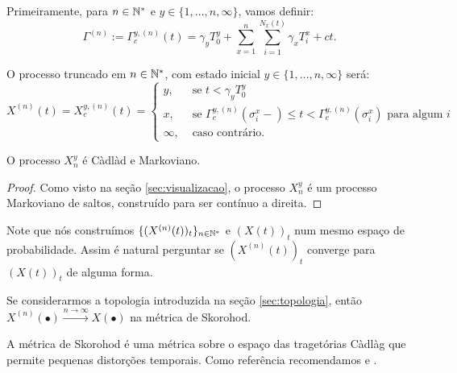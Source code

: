 Primeiramente, para $n \in {\mathbb{N^*}}$ e $y \in \{1, \ldots, n, \infty\}$,
vamos definir:
\begin{equation}
  \Gamma^{(n)} := \Gamma^{y,(n)}_c (t) = \gamma_y T_0^y
  + \sum_{x =1}^{n} \sum_{i = 1}^{N_x(t)}
  \gamma_x T_i^x
  + ct.
\end{equation}

O processo truncado em $n \in {\mathbb{N^*}}$, com estado inicial $y \in \{1,
\ldots, n, \infty\}$ será:
\begin{equation}
  X^{(n)}(t) = X^{y,(n)}_c(t) = \begin{cases}
    y, & \textrm{ se }  t < \gamma_y T_0^y\\
    x, & \textrm{ se } \Gamma^{y,(n)}_c(\sigma_i^x-) \leq t <
    \Gamma^{y,(n)}_c(\sigma^x_i)
    \textrm{ para algum } i \\
    \infty, & \textrm{ caso contrário.}
  \end{cases}
\end{equation}

\begin{proposicao}
  O processo $X_n^y$ é Càdlàd e Markoviano.
\end{proposicao}
\begin{proof}
  Como visto na seção \ref{sec:visualizacao}, o processo $X_n^y$ é um
  processo Markoviano de saltos, construído para ser contínuo a
  direita.
\end{proof}

Note que nós construímos $\{(X^{(n)}(t))_t\}_{n \in {\mathbb{N^*}}}$ e $(X(t))_t$
num mesmo espaço de probabilidade. Assim é natural perguntar se
$(X^{(n)}(t))_t$ converge para $(X(t))_t$ de alguma forma.

\begin{teorema}
  \label{teo:convergencia}
  Se considerarmos a topologia introduzida na seção
  \ref{sec:topologia}, então $X^{(n)} (\bullet) \xrightarrow{n \to
    \infty} X(\bullet)$ \qc na métrica de Skorohod.
\end{teorema}

A métrica de Skorohod é uma métrica sobre o espaço das tragetórias
Càdlàg que permite pequenas distorções temporais. Como
referência recomendamos \cite{billingsley:99} e \cite{ethier:86}.


